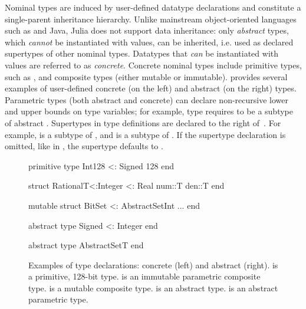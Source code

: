 Nominal types are induced by user-defined datatype declarations and constitute
a single-parent inheritance hierarchy.
Unlike mainstream object-oriented languages such as \CSharp and Java,
Julia does not support data inheritance: only \emph{abstract} types,
which \emph{cannot} be instantiated with values, can be inherited,
i.e. used as declared supertypes of other nominal types.
Datatypes that \emph{can} be instantiated with values are referred to as
\emph{concrete}. Concrete nominal types include primitive types,
such as , and composite  types (either mutable or
immutable).
 provides several examples of user-defined
concrete (on the left) and abstract (on the right) types.
Parametric types (both abstract and concrete) 
can declare non-recursive lower and upper bounds on type variables;
for example, type  requires  to be a subtype of
abstract .
Supertypes in type definitions are declared to the right of~\cjl{<:}.
For example,  is a subtype of , and  is a
subtype of . If the supertype declaration is omitted, like in
, the supertype defaults to .

\begin{figure}[t] 
\begin{minipage}{5.5cm}
\begin{julia}
primitive type Int128 <: Signed 128
end

struct Rational{T<:Integer} <: Real
  num::T
  den::T
end

mutable struct
  BitSet <: AbstractSet{Int}
  ...
end
\end{julia}
\end{minipage}
\hspace{1.2cm}
\begin{minipage}{4.8cm}
\begin{julia}
abstract type Signed <: Integer
end

abstract type AbstractSet{T}
end
\end{julia}
\end{minipage}
\caption{Examples of type declarations:
  concrete (left) and abstract (right).
   is a primitive, 128-bit type.
   is an immutable parametric composite type.
   is a mutable composite type.
   is an abstract type.
   is an abstract parametric type.
}\label{fig:code:user-def-types}
\end{figure}


